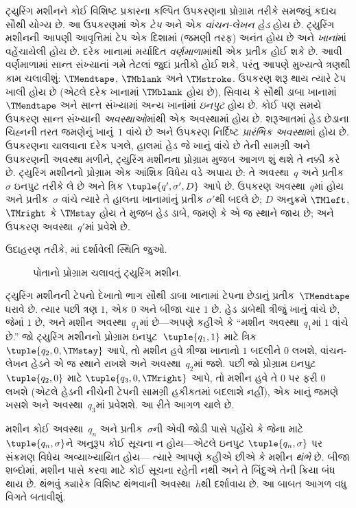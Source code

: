 \documentclass[../../../include/open-logic-section]{subfiles}
\begin{document}
\begin{explain}
ટ્યુરિંગ મશીનને કોઈ વિશિષ્ટ પ્રકારના કલ્પિત ઉપકરણના પ્રોગ્રામ
તરીકે સમજવું કદાચ સૌથી યોગ્ય છે. આ ઉપકરણમાં એક \emph{ટેપ} અને
એક \emph{વાંચન-લેખન હેડ} હોય છે. ટ્યુરિંગ મશીનની આપણી આવૃત્તિમાં
ટેપ એક દિશામાં (જમણી તરફ) અનંત હોય છે અને \emph{ખાનાં}માં
વહેંચાયેલી હોય છે. દરેક ખાનામાં મર્યાદિત \emph{વર્ણમાળા}માંથી
એક પ્રતીક હોઈ શકે છે. આવી વર્ણમાળામાં સાન્ત સંખ્યાનાં ગમે તેટલાં જુદાં પ્રતીકો
હોઈ શકે, પરંતુ આપણે મુખ્યત્વે ત્રણથી કામ ચલાવીશું:
$\TMendtape$, $\TMblank$ અને $\TMstroke$. ઉપકરણ શરૂ થાય ત્યારે
ટેપ ખાલી હોય છે (એટલે દરેક ખાનામાં $\TMblank$ હોય છે), સિવાય કે
સૌથી ડાબા ખાનામાં $\TMendtape$ અને સાન્ત સંખ્યામાં અન્ય ખાનાંમાં
\emph{ઇનપુટ} હોય છે. કોઈ પણ સમયે ઉપકરણ સાન્ત સંખ્યાની
\emph{અવસ્થાઓ}માંથી એક અવસ્થામાં હોય છે. શરૂઆતમાં હેડ છેડાના
ચિહ્નની તરત જમણેનું ખાનું~$1$ વાંચે છે અને ઉપકરણ નિર્દિષ્ટ \emph{પ્રારંભિક અવસ્થા}માં
હોય છે. ઉપકરણના ચાલવાના દરેક પગલે, હાલમાં હેડ જે ખાનું વાંચે
છે તેની સામગ્રી અને ઉપકરણની અવસ્થા મળીને, ટ્યુરિંગ મશીનના
પ્રોગ્રામ મુજબ આગળ શું થશે તે નક્કી કરે છે. ટ્યુરિંગ મશીનનો
પ્રોગ્રામ એક આંશિક વિધેય વડે અપાય છે: તે અવસ્થા~$q$ અને
પ્રતીક~$\sigma$ ઇનપુટ તરીકે લે છે અને ત્રિક
$\tuple{q', \sigma', D}$ આપે છે. ઉપકરણ અવસ્થા~$q$માં હોય અને
પ્રતીક~$\sigma$ વાંચે ત્યારે તે હાલના ખાનામાંનું પ્રતીક
$\sigma'$થી બદલે છે; $D$ અનુક્રમે $\TMleft$, $\TMright$ કે
$\TMstay$ હોય તે મુજબ હેડ ડાબે, જમણે કે એ જ સ્થાને જાય છે;
અને ઉપકરણ અવસ્થા~$q'$માં પ્રવેશે છે.

ઉદાહરણ તરીકે, માં દર્શાવેલી સ્થિતિ જુઓ.
\begin{figure}
  \caption{પોતાનો પ્રોગ્રામ ચલાવતું ટ્યુરિંગ મશીન.}
\end{figure}
ટ્યુરિંગ મશીનની ટેપનો દેખાતો ભાગ સૌથી ડાબા ખાનામાં ટેપના
છેડાનું પ્રતીક~$\TMendtape$ ધરાવે છે. ત્યાર પછી ત્રણ $1$,
એક $0$ અને બીજા ચાર $1$ છે. હેડ ડાબેથી ત્રીજું ખાનું વાંચે
છે, જેમાં $1$ છે, અને મશીન અવસ્થા~$q_1$માં છે---અપણે કહીએ
કે ``મશીન અવસ્થા~$q_1$માં $1$ વાંચે છે.'' જો ટ્યુરિંગ મશીનનો
પ્રોગ્રામ ઇનપુટ~$\tuple{q_1, 1}$ માટે ત્રિક
$\tuple{q_2, 0, \TMstay}$ આપે, તો મશીન હવે ત્રીજા ખાનાનો
$1$ બદલીને $0$ લખશે, વાંચન-લેખન હેડને એ જ સ્થાને રાખશે અને
અવસ્થા~$q_2$માં જશે. પછી જો પ્રોગ્રામ ઇનપુટ~$\tuple{q_2, 0}$
માટે $\tuple{q_3, 0, \TMright}$ આપે, તો મશીન હવે તે $0$ પર
ફરી $0$ લખશે (એટલે હેડની નીચેની ટેપની સામગ્રી હકીકતમાં
બદલાશે નહીં), એક ખાનું જમણે ખસશે અને અવસ્થા~$q_3$માં
પ્રવેશશે. આ રીતે આગળ ચાલે છે.

મશીન કોઈ અવસ્થા~$q_n$ અને પ્રતીક~$\sigma$ની એવી જોડી પાસે
પહોંચે કે જેના માટે $\tuple{q_n, \sigma}$ને અનુરૂપ કોઈ સૂચના
ન હોય---એટલે ઇનપુટ $\tuple{q_n,\sigma}$ પર સંક્રમણ વિધેય
અવ્યાખ્યાયિત હોય---
ત્યારે આપણે કહીએ છીએ કે મશીન \emph{થંભે} છે. બીજા શબ્દોમાં,
મશીન પાસે કરવા માટે કોઈ સૂચના રહેતી નથી અને તે બિંદુએ તેની
ક્રિયા બંધ થાય છે. થંભવું ક્યારેક વિશિષ્ટ થંભવાની
અવસ્થા~$h$થી દર્શાવાય છે. આ બાબત આગળ વધુ વિગતે બતાવીશું.
\end{explain}
\end{document}
